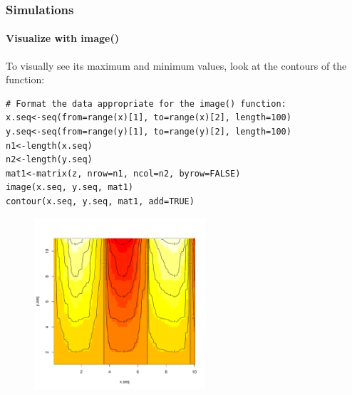 \begin{frame}
\frametitle{Simulations}
\framesubtitle{Visualize with \ttfamily image() \normalfont}

To visually see its maximum and minimum values, look at the contours of the function:

\begin{lstlisting}
# Format the data appropriate for the image() function:
x.seq<-seq(from=range(x)[1], to=range(x)[2], length=100)
y.seq<-seq(from=range(y)[1], to=range(y)[2], length=100)
n1<-length(x.seq)
n2<-length(y.seq)
mat1<-matrix(z, nrow=n1, ncol=n2, byrow=FALSE)
image(x.seq, y.seq, mat1)
contour(x.seq, y.seq, mat1, add=TRUE)
\end{lstlisting}

\newpage
   \begin{figure}[ht]
       \begin{center}
		\includegraphics[width = 2.5in]{images/contourSim.pdf}
	\end{center}
   \end{figure}
\end{frame}


